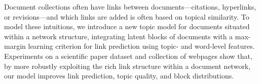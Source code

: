 Document collections often have links between documents---citations, hyperlinks, or revisions---and which links are added is often based on topical similarity. To model these intuitions, we introduce a new topic model for documents situated within a network structure, integrating latent blocks of documents with a max-margin learning criterion for link prediction using topic- and word-level features.  Experiments on a scientific paper dataset and collection of webpages show that, by more robustly exploiting the rich link structure within a document network, our model improves link prediction, topic quality, and block distributions.
